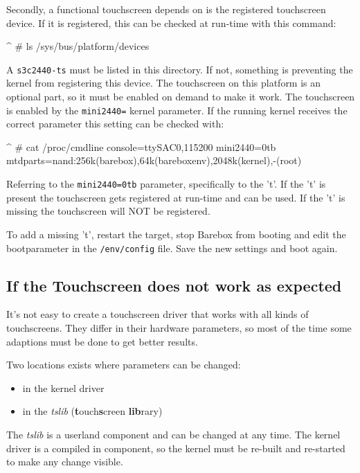 Secondly, a functional touchscreen depends on is the registered touchscreen
device. If it is registered, this can be checked at run-time with this command:

\begin{ptxshell}[escapechar=|]{^}
# ls /sys/bus/platform/devices
\end{ptxshell}

A \texttt{s3c2440-ts} must be listed in this directory. If not, something
is preventing the kernel from registering this device. The touchscreen on this
platform is an optional part, so it must be enabled on demand to make it work.
The touchscreen is enabled by the \texttt{mini2440=} kernel parameter. If the
running kernel receives the correct parameter this setting can be checked with:

\begin{ptxshell}[escapechar=|]{^}
# cat /proc/cmdline
console=ttySAC0,115200 mini2440=0tb mtdparts=nand:256k(barebox),64k(bareboxenv),2048k(kernel),-(root)
\end{ptxshell}

Referring to the \texttt{mini2440=0tb} parameter, specifically to the 't'.
If the 't' is present the touchscreen gets registered at run-time and can be
used. If the 't' is missing the touchscreen will NOT be registered.

To add a missing 't', restart the target, stop Barebox from booting and edit
the bootparameter in the \texttt{/env/config} file. Save the new settings and
boot again.

\subsection{If the Touchscreen does not work as expected}

It's not easy to create a touchscreen driver that works with all kinds of
touchscreens. They differ in their hardware parameters, so most of the time
some adaptions must be done to get better results.

Two locations exists where parameters can be changed:

\begin{itemize}
	\item in the kernel driver
	\item in the \textit{tslib} (\textbf{t}ouch\textbf{s}creen \textbf{lib}rary)
\end{itemize}

The \textit{tslib} is a userland component and can be changed at any time.
The kernel driver is a compiled in component, so the kernel must be re-built
and re-started to make any change visible.

